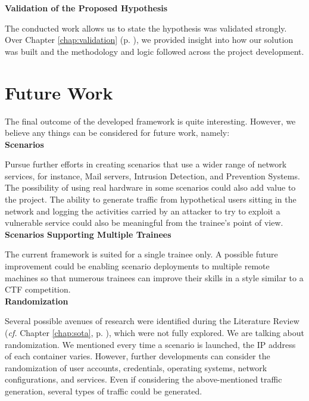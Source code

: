 \textbf{Validation of the Proposed Hypothesis}

The conducted work allows us to state the hypothesis was validated strongly. Over Chapter \ref{chap:validation} (p. \pageref{chap:validation}), we provided insight into how our solution was built and the methodology and logic followed across the project development.

\section{Future Work} \label{sec:future_work}

The final outcome of the developed framework is quite interesting. However, we believe any things can be considered for future work, namely:\\

\textbf{Scenarios}

Pursue further efforts in creating scenarios that use a wider range of network services, for instance, Mail servers, Intrusion Detection, and Prevention Systems. The possibility of using real hardware in some scenarios could also add value to the project. The ability to generate traffic from hypothetical users sitting in the network and logging the activities carried by an attacker to try to exploit a vulnerable service could also be meaningful from the trainee's point of view.\\

\textbf{Scenarios Supporting Multiple Trainees}

The current framework is suited for a single trainee only. A possible future improvement could be enabling scenario deployments to multiple remote machines so that numerous trainees can improve their skills in a style similar to a CTF competition.\\

\textbf{Randomization}

Several possible avenues of research were identified during the Literature Review (\textit{cf.} Chapter \ref{chap:sota}, p. \pageref{chap:sota}), which were not fully explored. We are talking about randomization. We mentioned every time a scenario is launched, the IP address of each container varies. However, further developments can consider the randomization of user accounts, credentials, operating systems,  network configurations, and services. Even if considering the above-mentioned traffic generation, several types of traffic could be generated.\\


